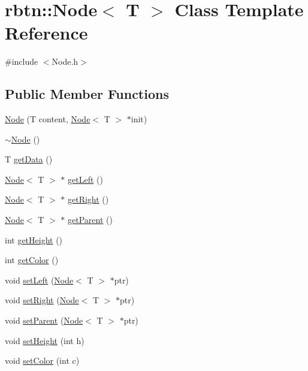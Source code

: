 \hypertarget{classrbtn_1_1_node}{}\section{rbtn\+:\+:Node$<$ T $>$ Class Template Reference}
\label{classrbtn_1_1_node}


{\ttfamily \#include $<$Node.\+h$>$}

\subsection*{Public Member Functions}
\begin{DoxyCompactItemize}
\item 
\hyperlink{classrbtn_1_1_node_acfb528726feb8ef65743bf0c506bfd40}{Node} (T content, \hyperlink{classrbtn_1_1_node}{Node}$<$ T $>$ $\ast$init)
\item 
\hyperlink{classrbtn_1_1_node_aa5f13c1b87ece209179dc03b88d74c5f}{$\sim$\+Node} ()
\item 
T \hyperlink{classrbtn_1_1_node_a00d8da51095ee605c96287eeceb33d58}{get\+Data} ()
\item 
\hyperlink{classrbtn_1_1_node}{Node}$<$ T $>$ $\ast$ \hyperlink{classrbtn_1_1_node_af844c782f87cda64776c458085768708}{get\+Left} ()
\item 
\hyperlink{classrbtn_1_1_node}{Node}$<$ T $>$ $\ast$ \hyperlink{classrbtn_1_1_node_ae8a40794133898ef4cbd291910a8d501}{get\+Right} ()
\item 
\hyperlink{classrbtn_1_1_node}{Node}$<$ T $>$ $\ast$ \hyperlink{classrbtn_1_1_node_a6b0de7085e8129ec1f5a162436d8cc15}{get\+Parent} ()
\item 
int \hyperlink{classrbtn_1_1_node_a697ea8feefdfc055f1f357fab6c32984}{get\+Height} ()
\item 
int \hyperlink{classrbtn_1_1_node_ac1fb75d8904466e59c85489a0cd29bdf}{get\+Color} ()
\item 
void \hyperlink{classrbtn_1_1_node_a646175ae54d17f047a8273e29f346e5c}{set\+Left} (\hyperlink{classrbtn_1_1_node}{Node}$<$ T $>$ $\ast$ptr)
\item 
void \hyperlink{classrbtn_1_1_node_a34770e9eead1a1f0c3f619a2c77193cf}{set\+Right} (\hyperlink{classrbtn_1_1_node}{Node}$<$ T $>$ $\ast$ptr)
\item 
void \hyperlink{classrbtn_1_1_node_ac00a0c276508a7334dc319fade003f23}{set\+Parent} (\hyperlink{classrbtn_1_1_node}{Node}$<$ T $>$ $\ast$ptr)
\item 
void \hyperlink{classrbtn_1_1_node_a2fdfb3c4cf783e4cbb2713e76ab43d98}{set\+Height} (int h)
\item 
void \hyperlink{classrbtn_1_1_node_a00e77f345775e853ccae31d67e179803}{set\+Color} (int c)
\end{DoxyCompactItemize}



